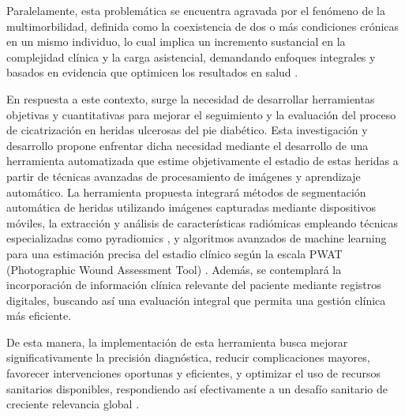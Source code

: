 Paralelamente, esta problemática se encuentra agravada por el fenómeno de la multimorbilidad, definida como la coexistencia de dos o más condiciones crónicas en un mismo individuo, lo cual implica un incremento sustancial en la complejidad clínica y la carga asistencial, demandando enfoques integrales y basados en evidencia que optimicen los resultados en salud \cite{sarmiento2022patrones}.

En respuesta a este contexto, surge la necesidad de desarrollar herramientas objetivas y cuantitativas para mejorar el seguimiento y la evaluación del proceso de cicatrización en heridas ulcerosas del pie diabético. Esta investigación y desarrollo propone enfrentar dicha necesidad mediante el desarrollo de una herramienta automatizada que estime objetivamente el estadio de estas heridas a partir de técnicas avanzadas de procesamiento de imágenes y aprendizaje automático. La herramienta propuesta integrará métodos de segmentación automática de heridas utilizando imágenes capturadas mediante dispositivos móviles, la extracción y análisis de características radiómicas empleando técnicas especializadas como pyradiomics \cite{van2017computational}, y algoritmos avanzados de machine learning para una estimación precisa del estadio clínico según la escala PWAT (Photographic Wound Assessment Tool) \cite{thompson2013reliability}. Además, se contemplará la incorporación de información clínica relevante del paciente mediante registros digitales, buscando así una evaluación integral que permita una gestión clínica más eficiente.

De esta manera, la implementación de esta herramienta busca mejorar significativamente la precisión diagnóstica, reducir complicaciones mayores, favorecer intervenciones oportunas y eficientes, y optimizar el uso de recursos sanitarios disponibles, respondiendo así efectivamente a un desafío sanitario de creciente relevancia global \cite{organizacion2016informe}.